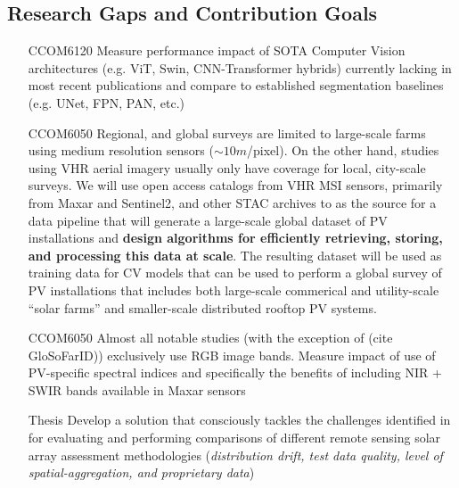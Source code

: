 \begin{multicols}{2}
\subsection{Research Gaps and Contribution Goals}
    \begin{enumerate}
        \item [CCOM6120] Measure performance impact of SOTA Computer Vision architectures (e.g. ViT, Swin, CNN-Transformer hybrids) currently lacking in most recent publications and compare to established segmentation baselines (e.g. UNet, FPN, PAN, etc.)
        \item [CCOM6050] Regional, and global surveys are limited to large-scale farms using medium resolution sensors ($\sim10m$/pixel). On the other hand, studies using VHR aerial imagery usually only have coverage for local, city-scale surveys.
        We will use open access catalogs from VHR MSI sensors, primarily from Maxar and Sentinel2, and other STAC archives to as the source for a data pipeline that will generate a 
        large-scale global dataset of PV installations and \textbf{design algorithms for efficiently retrieving, storing, and processing this data at scale}. 
        The resulting dataset will be used as training data for CV models that can be used to perform a global survey of PV installations that includes both large-scale commerical and utility-scale ``solar farms'' and smaller-scale distributed rooftop PV systems.
        \item [CCOM6050] Almost all notable studies (with the exception of (cite GloSoFarID)) exclusively use RGB image bands. Measure impact of use of PV-specific spectral indices\cite{He_universal_pv_spectral_index_2024} and specifically the benefits of including NIR + SWIR bands available in Maxar sensors
        \item [Thesis] Develop a solution that consciously tackles the challenges identified in \cite{Hu_solar_array_pitfalls_2022} for evaluating and performing comparisons of different remote sensing solar array assessment methodologies
        (\textit{distribution drift, test data quality, level of spatial-aggregation, and proprietary data})
    \end{enumerate}


\end{multicols}



